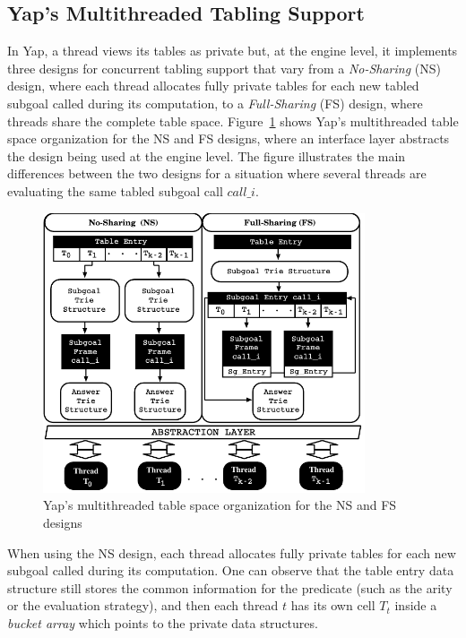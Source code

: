 \documentclass{llncs}
\begin{document}

\subsection{Yap's Multithreaded Tabling Support}

In Yap, a thread views its tables as private but, at the engine level,
it implements three designs for concurrent tabling support that vary
from a \emph{No-Sharing} (NS) design, where each thread allocates
fully private tables for each new tabled subgoal called during its
computation, to a \emph{Full-Sharing} (FS) design, where threads share
the complete table space. Figure~\ref{fig_yap_mt_support} shows Yap's
multithreaded table space organization for the NS and FS designs,
where an interface layer abstracts the design being used at the engine
level. The figure illustrates the main differences between the two
designs for a situation where several threads are evaluating the same
tabled subgoal call $call\_i$.

\begin{figure}[!ht]
\vspace{-0.5\intextsep}
\centering
\includegraphics[width=9.5cm]{figures/yap-mt.pdf}
\caption{Yap's multithreaded table space organization for the NS and FS designs}
\label{fig_yap_mt_support}
\vspace{-1.0\intextsep}
\end{figure}

When using the NS design, each thread allocates fully private tables
for each new subgoal called during its computation. One can observe
that the table entry data structure still stores the common
information for the predicate (such as the arity or the evaluation
strategy), and then each thread $t$ has its own cell $T_t$ inside a
\emph{bucket array} which points to the private data structures.
\end{document}
